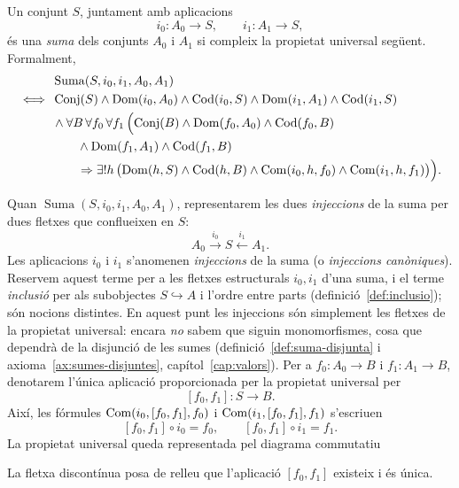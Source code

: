\begin{definicio}[Suma]\label{def:suma-conjunts}
Un conjunt \(S\), juntament amb aplicacions
\[
i_0:A_0\to S,
\qquad
i_1:A_1\to S,
\]
és una \emph{suma} dels conjunts \(A_0\) i \(A_1\) si compleix la propietat universal següent. Formalment,
\[
\begin{aligned}
&\operatorname{Suma}(S,i_0,i_1,A_0,A_1)
\\
\iff {}&
\operatorname{Conj}(S)
\land\operatorname{Dom}(i_0,A_0)\land\operatorname{Cod}(i_0,S)
\land\operatorname{Dom}(i_1,A_1)\land\operatorname{Cod}(i_1,S)
\\
&{}\land
\forall B\,\forall f_0\,\forall f_1\,
\Bigl(
\operatorname{Conj}(B)
\land\operatorname{Dom}(f_0,A_0)\land\operatorname{Cod}(f_0,B)
\\
&\qquad{}\land\operatorname{Dom}(f_1,A_1)\land\operatorname{Cod}(f_1,B)
\\
&\qquad{}\Rightarrow
\exists!h\,
\bigl(
\operatorname{Dom}(h,S)\land\operatorname{Cod}(h,B)
\land\operatorname{Com}(i_0,h,f_0)\land\operatorname{Com}(i_1,h,f_1)
\bigr)
\Bigr).
\end{aligned}
\]
\end{definicio}

\begin{notacio}\label{not:suma}
Quan \(\operatorname{Suma}(S,i_0,i_1,A_0,A_1)\), representarem les dues \emph{injeccions} de la suma per dues fletxes que conflueixen en \(S\):
\[
A_0\xrightarrow{i_0}S\xleftarrow{i_1}A_1.
\]
Les aplicacions \(i_0\) i \(i_1\) s'anomenen \emph{injeccions} de la suma (o \emph{injeccions canòniques}). Reservem aquest terme per a les fletxes estructurals \(i_0,i_1\) d'una suma, i el terme \emph{inclusió} per als subobjectes \(S\hookrightarrow A\) i l'ordre entre parts (definició~\ref{def:inclusio}); són nocions distintes. En aquest punt les injeccions són simplement les fletxes de la propietat universal: encara \emph{no} sabem que siguin monomorfismes, cosa que dependrà de la disjunció de les sumes (definició~\ref{def:suma-disjunta} i axioma~\ref{ax:sumes-disjuntes}, capítol~\ref{cap:valors}). Per a \(f_0:A_0\to B\) i \(f_1:A_1\to B\), denotarem l'única aplicació proporcionada per la propietat universal per
\[
[f_0,f_1]:S\to B.
\]
Així, les fórmules \(\operatorname{Com}(i_0,[f_0,f_1],f_0)\) i \(\operatorname{Com}(i_1,[f_0,f_1],f_1)\) s'escriuen
\[
[f_0,f_1]\circ i_0=f_0,
\qquad
[f_0,f_1]\circ i_1=f_1.
\]
La propietat universal queda representada pel diagrama commutatiu
\begin{center}
\end{center}
La fletxa discontínua posa de relleu que l'aplicació \([f_0,f_1]\) existeix i és única.
\end{notacio}

